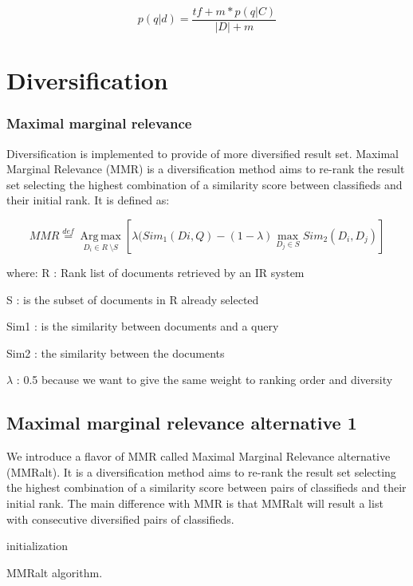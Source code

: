 \begin{equation}
p(q|d) =\frac{tf + m * p(q|C) }{|D| + m}
\end{equation}


\section{Diversification}

\subsubsection{Maximal marginal relevance}
Diversification is implemented to provide of more diversified result set. Maximal Marginal Relevance (MMR) is a diversification method aims to re-rank the result set selecting the highest combination of a similarity score between classifieds and their initial rank. It is defined as:


\begin{equation}
MMR\overset{def}{=}\operatorname*{Arg\, \max}_{D_{i} \in R\ \setminus S}[\lambda(Sim_{1}(Di,Q)-(1-\lambda)\underset{{D_{j}\in S}}{\max}Sim_{2}(D_{i},D_{j})]
\end{equation}

where:
R : Rank list of documents retrieved by an IR system

S : is the subset of documents in R already selected

Sim1 : is the similarity between documents and a query

Sim2 : the similarity between the documents

$\lambda$ : 0.5 because we want to give the same weight to ranking order and diversity


\subsection{Maximal marginal relevance alternative 1}

We introduce a flavor of MMR called Maximal Marginal Relevance alternative (MMRalt). It is a diversification method aims to re-rank the result set selecting the highest combination of a similarity score between pairs of classifieds and their initial rank. The main difference with MMR is that MMRalt will result a list with consecutive diversified pairs of classifieds. 


\begin{algorithm}[H]
 initialization\;
 \caption{MMRalt algorithm.}
\end{algorithm}



